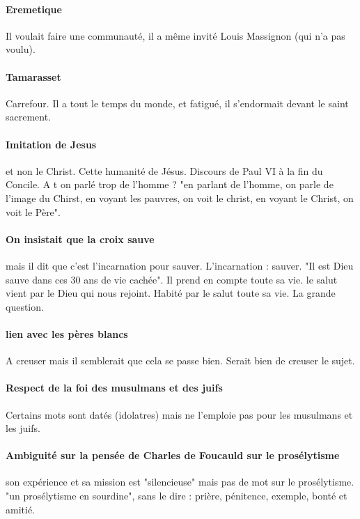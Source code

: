 \paragraph{Eremetique} Il voulait faire une communauté, il a même invité Louis Massignon (qui n'a pas voulu). 

\paragraph{Tamarasset} Carrefour. Il a tout le temps du monde, et fatigué, il s'endormait devant le saint sacrement.


\paragraph{Imitation de Jesus} et non le Christ. Cette humanité de Jésus.  Discours de Paul VI à la fin du Concile. A t on parlé trop de l'homme ? "en parlant de l'homme, on parle de l'image du Chirst, en voyant les pauvres, on voit le christ, en voyant le Christ, on voit le Père".

\paragraph{On insistait que la croix sauve} mais il dit que c'est l'incarnation pour sauver. L'incarnation : sauver. "Il est Dieu sauve dans ces 30 ans de vie cachée". Il prend en compte toute sa vie. le salut vient par le Dieu qui nous rejoint. 
Habité par le salut toute sa vie. La grande question. 


\paragraph{lien avec les pères blancs} A creuser mais il semblerait que cela se passe bien. Serait bien de creuser le sujet. 


\paragraph{Respect de la foi des musulmans et des juifs} Certains mots sont datés (idolatres) mais ne l'emploie pas pour les musulmans et les juifs.


\paragraph{Ambiguité sur la pensée de Charles de Foucauld sur le prosélytisme} son expérience et sa mission est "silencieuse" mais pas de mot sur le prosélytisme.
"un prosélytisme en sourdine", sans le dire : prière, pénitence, exemple, bonté et amitié. 


